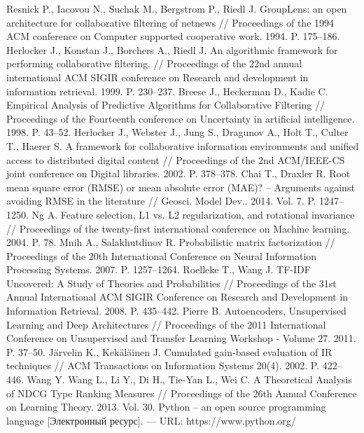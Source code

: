 \documentclass[a4paper,article,14pt]{extarticle}
\begin{document}
\begin{thebibliography}{1}
 Resnick P., Iacovou N., Suchak M., Bergstrom P., Riedl J. GroupLens: an open architecture for collaborative filtering of netnews // Proceedings of the 1994 ACM conference on Computer supported cooperative work. 1994. P. 175--186.
 Herlocker J., Konstan J., Borchers A., Riedl J. An algorithmic framework for performing collaborative filtering. // Proceedings of the 22nd annual international ACM SIGIR conference on Research and development in information retrieval. 1999. P. 230--237.
 Breese J., Heckerman D., Kadie C. Empirical Analysis of Predictive Algorithms for Collaborative Filtering //  Proceedings of the Fourteenth conference on Uncertainty in artificial intelligence. 1998. P. 43--52.
 Herlocker J., Webster J., Jung S., Dragunov A., Holt T., Culter T., Haerer S. A framework for collaborative information environments and unified access to distributed digital content // Proceedings of the 2nd ACM/IEEE-CS joint conference on Digital libraries. 2002. P. 378--378.
 Chai T., Draxler R. Root mean square error (RMSE) or mean absolute error (MAE)? – Arguments against avoiding RMSE in the literature // Geosci. Model Dev.. 2014. Vol. 7. P. 1247--1250.
 Ng A. Feature selection, L1 vs. L2 regularization, and rotational invariance // Proceedings of the twenty-first international conference on Machine learning. 2004. P. 78.
 Mnih A., Salakhutdinov R. Probabilistic matrix factorization // Proceedings of the 20th International Conference on Neural Information Processing Systems. 2007. P. 1257--1264.
 Roelleke T., Wang J. TF-IDF Uncovered: A Study of Theories and Probabilities // Proceedings of the 31st Annual International ACM SIGIR Conference on Research and Development in Information Retrieval. 2008. P. 435--442.
 Pierre B.  Autoencoders, Unsupervised Learning and Deep Architectures // Proceedings of the 2011 International Conference on Unsupervised and Transfer Learning Workshop - Volume 27. 2011. P. 37--50.
 Järvelin K., Kekäläinen J.  Cumulated gain-based evaluation of IR techniques // ACM Transactions on Information Systems 20(4). 2002. P. 422--446.
 Wang Y. Wang L., Li Y., Di H., Tie-Yan L., Wei C.  A Theoretical Analysis of NDCG Type Ranking Measures // Proceedings of the 26th Annual Conference on Learning Theory. 2013. Vol. 30.
 Python -- an open source programming language [Электронный ресурс]. — URL: https://www.python.org/

\end{thebibliography}
\end{document}
